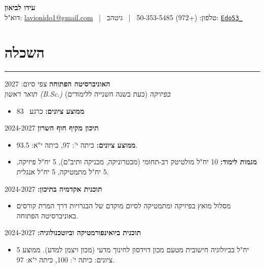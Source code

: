 \documentclass[11pt, a4paper]{article}
\begin{document}
\begin{hebrew}
\begin{center}
    {\Huge \textbf{עידו לביאון}} \\ \vspace{8pt}
    דוא"ל: \href{mailto:lavionido1@gmail.com}{\textenglish{lavionido1@gmail.com}} ~|~ 
    טלפון: \textenglish{(+972) 50-353-5485} ~|~ 
    גיטהב: \href{https://github.com/dotRetrd1}{\textenglish{\texttt{Edo53\_}}}
\end{center}

\vspace{10pt}

\section*{השכלה}
\hrule \vspace{8pt}

\noindent \textbf{האוניברסיטה הפתוחה} \hfill צפי סיום: \textenglish{2027} \\
\textit{תואר ראשון (\textenglish{B.Sc.}) בפיזיקה} (כעת בשנה השנייה ללימודים)
\begin{itemize}[itemsep=2pt, parsep=0pt, topsep=2pt]
    \item \textbf{ממוצע ציונים:} כרגע ~83 
\end{itemize}

\vspace{5pt}

\noindent \textbf{תיכון מקיף חוף השרון} \hfill \textenglish{2024-2027}
\begin{itemize}[itemsep=2pt, parsep=0pt, topsep=2pt]
    \item \textbf{ממוצע ציונים:} כיתה י': \textenglish{97}, כיתה י"א: \textenglish{93.5}.
    \item \textbf{מגמות לימוד:} 10 יח"ל מולטיטק רב-תחומי (מכטרוניקה, מכניקה ותיב"ם), 5 יח"ל פיזיקה, 5 יח"ל מתמטיקה, 5 יח"ל אנגלית.
\end{itemize}
\noindent \textbf{תוכנית אקדמיה בתיכון:} \hfill \textenglish{2024-2027}
\begin{itemize}[itemsep=2pt, parsep=0pt, topsep=2pt]
    \item מסלול מואץ בפיזיקה ומתמטיקה לסיום מוקדם של הבגרויות דרך המרת קורסים באוניברסיטה הפתוחה.
\end{itemize}
\noindent \textbf{תוכנית ביואינפורמטיקה וביוטכנולוגיה:} \hfill \textenglish{2024-2027}
\begin{itemize}[itemsep=2pt, parsep=0pt, topsep=2pt]
    \item 5 יח"ל בביולוגיה חישובית מטעם מכון דוידסון לחינוך מדעי (מכון ויצמן למדע). ממוצע ציונים: כיתה י': \textenglish{100}, כיתה י"א: \textenglish{97}.
\end{itemize}



\end{hebrew}
\end{document}
